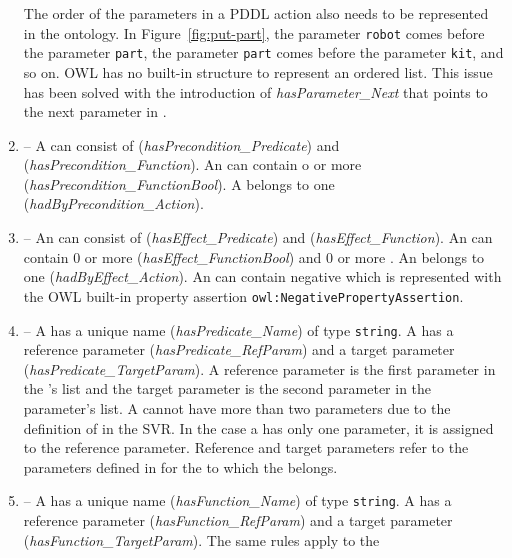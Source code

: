 \begin{enumerate}
    The order of the parameters in a PDDL action also needs to be represented 
in the ontology. In Figure~\ref{fig:put-part}, the parameter \texttt{robot} 
comes before the parameter \texttt{part}, the parameter \texttt{part} comes 
before the parameter \texttt{kit}, and so on. OWL has no built-in structure 
to represent an ordered list. This issue has been solved with the introduction 
of \emph{hasParameter\_Next} that points to the next parameter in .
\item {} -- A  can consist of  
(\emph{hasPrecondition\_Predicate}) and  (\emph{hasPrecondition\_Function}). 
An  can contain o or more  
(\emph{hasPrecondition\_FunctionBool}). A  belongs to one  
(\emph{hadByPrecondition\_Action}).
\item {} -- An  can consist of  
(\emph{hasEffect\_Predicate}) and  (\emph{hasEffect\_Function}). 
An  can contain 0 or more  (\emph{hasEffect\_FunctionBool}) 
and 0 or more . An  belongs to one  
(\emph{hadByEffect\_Action}). An  can contain negative  
which is represented with the OWL built-in property assertion \texttt{owl:NegativePropertyAssertion}.
\item {} -- A  has a unique name (\emph{hasPredicate\_Name}) 
of type \texttt{string}. A  has a reference parameter 
(\emph{hasPredicate\_RefParam}) and a target parameter (\emph{hasPredicate\_TargetParam}). 
A reference parameter is the first parameter in the 's list and the target 
parameter is the second parameter in the parameter's list. A  cannot have 
more than two parameters due to the definition of  in the SVR. In the 
case a  has only one parameter, it is assigned to the reference parameter. 
Reference and target parameters refer to the parameters defined in  
for the  to which the  belongs.
\item {} -- A  has a unique name (\emph{hasFunction\_Name}) 
of type \texttt{string}. A  has a reference parameter (\emph{hasFunction\_RefParam}) 
and a target parameter (\emph{hasFunction\_TargetParam}). The same rules apply to the 

\end{enumerate}
